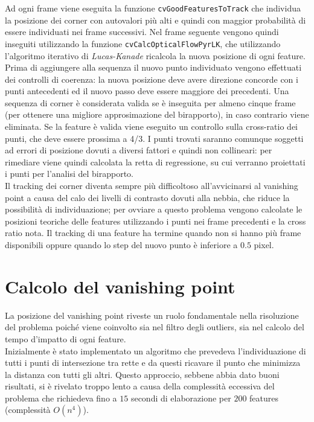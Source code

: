 \documentclass[12pt]{report}
\begin{document}
\noindent Ad ogni frame viene eseguita la funzione \verb|cvGoodFeaturesToTrack| che individua la posizione dei corner con autovalori pi\`u alti e quindi con maggior probabilit\`a di essere individuati nei frame successivi. Nel frame seguente vengono quindi inseguiti utilizzando la funzione \verb|cvCalcOpticalFlowPyrLK|, che utilizzando l'algoritmo iterativo di \emph{Lucas-Kanade} ricalcola la nuova posizione di ogni feature.\\

\noindent Prima di aggiungere alla sequenza il nuovo punto individuato vengono effettuati dei controlli di coerenza: la nuova posizione deve avere direzione concorde con i punti antecedenti ed il nuovo passo deve essere maggiore dei precedenti. Una sequenza di corner \`e considerata valida se \`e inseguita per almeno cinque frame (per ottenere una migliore approsimazione del birapporto), in caso contrario viene eliminata. Se la feature \`e valida viene eseguito un controllo sulla cross-ratio dei punti, che deve essere prossima a 4/3. I punti trovati saranno comunque soggetti ad errori di posizione dovuti a diversi fattori e quindi non collineari: per rimediare viene quindi calcolata la retta di regressione, su cui verranno proiettati i punti per l'analisi del birapporto.\\

\noindent Il tracking dei corner diventa sempre pi\`u difficoltoso all'avvicinarsi al vanishing point a causa del calo dei livelli di contrasto dovuti alla nebbia, che riduce la possibilit\`a di individuazione; per ovviare a questo problema vengono calcolate le posizioni teoriche delle features utilizzando i punti nei frame precedenti e la cross ratio nota. Il tracking di una feature ha termine quando non si hanno pi\`u frame disponibili oppure quando lo step del nuovo punto \`e inferiore a $0.5$ pixel.

\section{Calcolo del vanishing point}
La posizione del vanishing point riveste un ruolo fondamentale nella risoluzione del problema poich\'e viene coinvolto sia nel filtro degli outliers, sia nel calcolo del tempo d'impatto di ogni feature.\\

\noindent Inizialmente \`e stato implementato un algoritmo che prevedeva l'individuazione di tutti i punti di intersezione tra rette e da questi ricavare il punto che minimizza la distanza con tutti gli altri. Questo approccio, sebbene abbia dato buoni risultati, si \`e rivelato troppo lento a causa della complessit\`a eccessiva del problema che richiedeva fino a $15$ secondi di elaborazione per $200$ features (complessit\`a $O\left(n^4\right)$).\\
\end{document}
